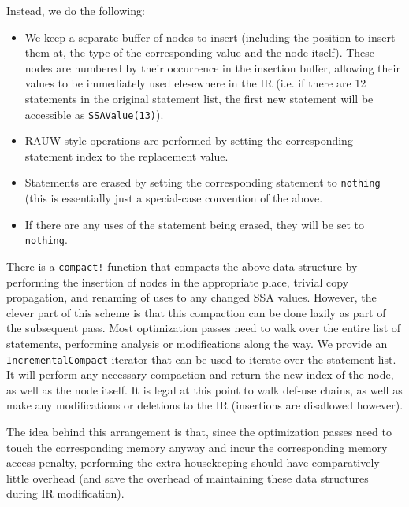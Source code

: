 Instead, we do the following:



\begin{itemize}
\item We keep a separate buffer of nodes to insert (including the position to insert them at, the type of the corresponding value and the node itself). These nodes are numbered by their occurrence in the insertion buffer, allowing their values to be immediately used elesewhere in the IR (i.e. if there are 12 statements in the original statement list, the first new statement will be accessible as \texttt{SSAValue(13)}).


\item RAUW style operations are performed by setting the corresponding statement index to the replacement value.


\item Statements are erased by setting the corresponding statement to \texttt{nothing} (this is essentially just a special-case convention of the above.


\item If there are any uses of the statement being erased, they will be set to \texttt{nothing}.

\end{itemize}


There is a \texttt{compact!} function that compacts the above data structure by performing the insertion of nodes in the appropriate place, trivial copy propagation, and renaming of uses to any changed SSA values. However, the clever part of this scheme is that this compaction can be done lazily as part of the subsequent pass. Most optimization passes need to walk over the entire list of statements, performing analysis or modifications along the way. We provide an \texttt{IncrementalCompact} iterator that can be used to iterate over the statement list. It will perform any necessary compaction and return the new index of the node, as well as the node itself. It is legal at this point to walk def-use chains, as well as make any modifications or deletions to the IR (insertions are disallowed however).



The idea behind this arrangement is that, since the optimization passes need to touch the corresponding memory anyway and incur the corresponding memory access penalty, performing the extra housekeeping should have comparatively little overhead (and save the overhead of maintaining these data structures during IR modification).



